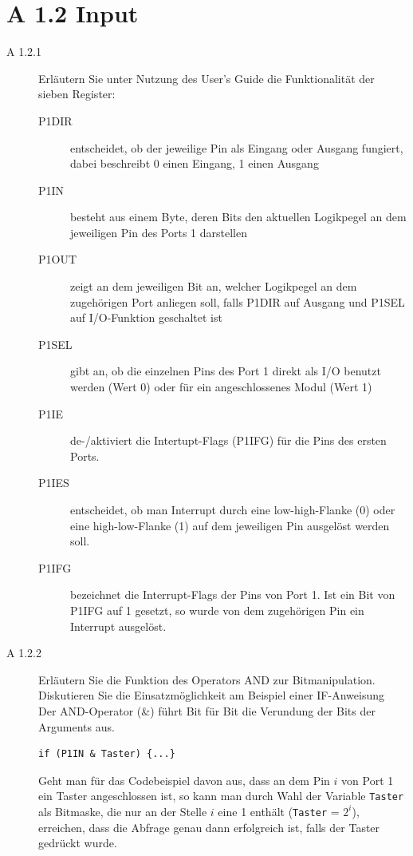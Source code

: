 \documentclass[11pt,a4paper,ngerman]{article}
\begin{document}
\newpage
\section*{A 1.2	Input}

\begin{description}
	\item[A 1.2.1] Erläutern Sie unter Nutzung des User's Guide die Funktionalität der sieben Register:
	
	\begin{description}
		\item[P1DIR] entscheidet, ob der jeweilige Pin als Eingang oder Ausgang fungiert, dabei beschreibt 0 einen Eingang, 1 einen Ausgang
		\item[P1IN] besteht aus einem Byte, deren Bits den aktuellen Logikpegel an dem jeweiligen Pin des Ports 1 darstellen
		\item[P1OUT] zeigt an dem jeweiligen Bit an, welcher Logikpegel an dem zugehörigen Port anliegen soll, falls P1DIR auf Ausgang und P1SEL auf I/O-Funktion geschaltet ist
		\item[P1SEL] gibt an, ob die einzelnen Pins des Port 1 direkt als I/O benutzt werden (Wert 0) oder für ein angeschlossenes Modul (Wert 1)
		\item[P1IE] de-/aktiviert die Intertupt-Flags (P1IFG) für die Pins des ersten Ports.
		\item[P1IES] entscheidet, ob man Interrupt durch eine low-high-Flanke (0) oder eine high-low-Flanke (1) auf dem jeweiligen Pin ausgelöst werden soll.
		\item[P1IFG] bezeichnet die Interrupt-Flags der Pins von Port 1. Ist ein Bit von P1IFG auf 1 gesetzt, so wurde von dem zugehörigen Pin ein Interrupt ausgelöst.
	\end{description}
	
	\item[A 1.2.2] Erläutern Sie die Funktion des Operators AND zur Bitmanipulation. Diskutieren Sie die Einsatzmöglichkeit am Beispiel einer IF-Anweisung \\
	
	Der AND-Operator (\&) führt Bit für Bit die Verundung der Bits der Arguments aus.\\
	\begin{lstlisting}
if (P1IN & Taster) {...}
	\end{lstlisting}
	Geht man für das Codebeispiel davon aus, dass an dem Pin $i$ von Port 1 ein Taster angeschlossen ist, so kann man durch Wahl der Variable \texttt{Taster} als Bitmaske, die nur an der Stelle $i$ eine 1 enthält (\texttt{Taster} = $2^i$), erreichen, dass die Abfrage genau dann erfolgreich ist, falls der Taster gedrückt wurde.
	

\end{description}
\end{document}
